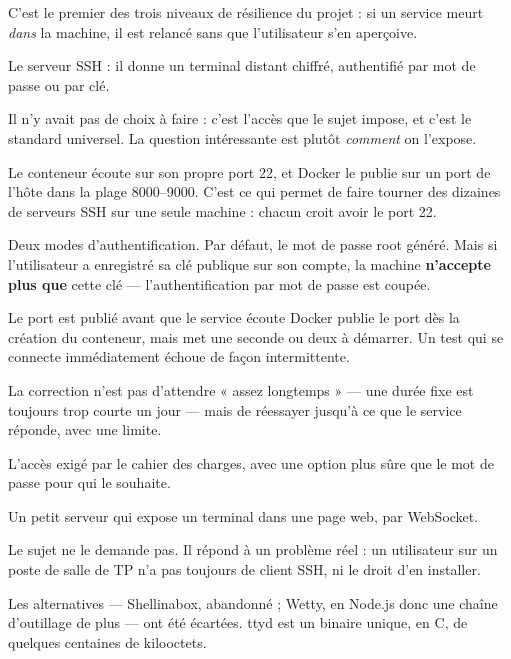 \apport
C'est le premier des trois niveaux de résilience du projet : si un service meurt
\emph{dans} la machine, il est relancé sans que l'utilisateur s'en aperçoive.


\quoi
Le serveur SSH : il donne un terminal distant chiffré, authentifié par mot de
passe ou par clé.

\pourquoi
Il n'y avait pas de choix à faire : c'est l'accès que le sujet impose, et c'est
le standard universel. La question intéressante est plutôt \emph{comment} on
l'expose.

Le conteneur écoute sur son propre port 22, et Docker le publie sur un port de
l'hôte dans la plage 8000--9000. C'est ce qui permet de faire tourner des
dizaines de serveurs SSH sur une seule machine : chacun croit avoir le port 22.

\role
Deux modes d'authentification. Par défaut, le mot de passe root généré. Mais si
l'utilisateur a enregistré sa clé publique sur son compte, la machine
\textbf{n'accepte plus que} cette clé --- l'authentification par mot de passe
est coupée.

\begin{piege}{Le port est publié avant que le service écoute}
Docker publie le port dès la création du conteneur, mais  met une
seconde ou deux à démarrer. Un test qui se connecte immédiatement échoue de
façon intermittente.

La correction n'est pas d'attendre « assez longtemps » --- une durée fixe est
toujours trop courte un jour --- mais de réessayer jusqu'à ce que le service
réponde, avec une limite.
\end{piege}

\apport
L'accès exigé par le cahier des charges, avec une option plus sûre que le mot
de passe pour qui le souhaite.


\quoi
Un petit serveur qui expose un terminal dans une page web, par WebSocket.

\pourquoi
Le sujet ne le demande pas. Il répond à un problème réel : un utilisateur sur un
poste de salle de TP n'a pas toujours de client SSH, ni le droit d'en installer.

Les alternatives --- Shellinabox, abandonné ; Wetty, en Node.js donc une chaîne
d'outillage de plus --- ont été écartées. ttyd est un binaire unique, en C, de
quelques centaines de kilooctets.

